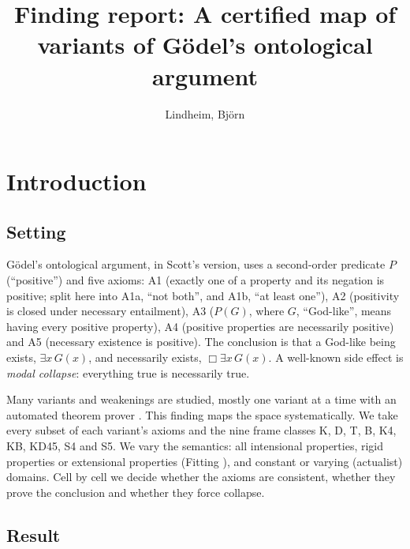 \documentclass{article}
\title{Finding report: A certified map of variants of Gödel's ontological argument}
\author{Lindheim, Björn}
\date{}
\begin{document}
\maketitle
\section{Introduction}
\label{sec:ontological-variant-map}

\subsection*{Setting}

Gödel's ontological argument, in Scott's version, uses a second-order predicate $P$ (``positive'')
and five axioms: A1 (exactly one of a property and its negation is positive; split here into
A1a, ``not both'', and A1b, ``at least one''), A2 (positivity is closed under necessary entailment),
A3 ($P(G)$, where $G$, ``God-like'', means having every positive property), A4 (positive
properties are necessarily positive) and A5 (necessary existence is positive). The conclusion is
that a God-like being exists, $\exists x\,G(x)$, and necessarily exists, $\Box\exists x\,G(x)$.
A well-known side effect is \emph{modal collapse}: everything true is necessarily true.

Many variants and weakenings are studied, mostly one variant at a time with an automated
theorem prover \cite{benzmueller2025notes,benzmueller2026lean,benzmueller2020simplified,benzmueller2019ultrafilters}. This finding maps the space systematically. We take every subset
of each variant's axioms and the nine frame classes K, D, T, B, K4, KB, KD45, S4 and S5. We
vary the semantics: all intensional properties, rigid properties or extensional properties
(Fitting \cite{fitting2002types}), and constant or varying (actualist) domains. Cell by cell we
decide whether the axioms are consistent, whether they prove the conclusion and whether they
force collapse.

\subsection*{Result}
\end{document}

